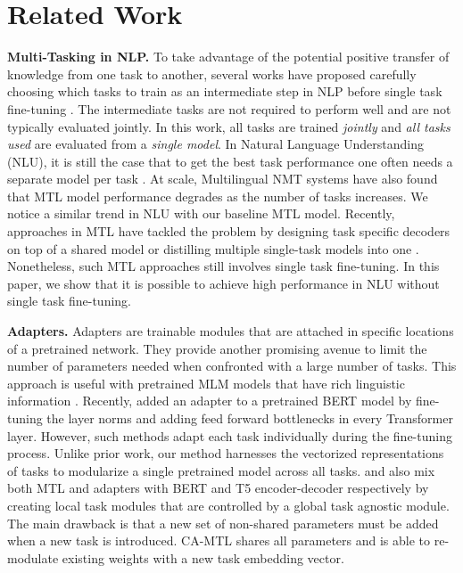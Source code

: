 \documentclass{article} \usepackage{iclr2021_conference,times}
\begin{document}
\vspace{-10pt}
\section{Related Work}
\vspace{-5pt}

\textbf{Multi-Tasking in NLP.}
To take advantage of the potential positive transfer of knowledge from one task to another, several works have proposed carefully choosing which tasks to train as an intermediate step in NLP before single task fine-tuning \citep{bingel-sogaard-2017-identifying,kerinec-etal-2018-deep,wang-acl-19,DBLP:journals/corr/abs-1905-07553,pruksachatkun2020intermediate,DBLP:journals/corr/abs-1811-01088}. The intermediate tasks are not required to perform well and are not typically evaluated jointly. In this work, all tasks are trained \emph{jointly} and \emph{all tasks used} are evaluated from a \emph{single model}. In Natural Language Understanding (NLU), it is still the case that to get the best task performance one often needs a separate model per task \citep{mtl_bert_clark2019,mccann2018natural}.
At scale, Multilingual NMT systems \citep{aharoni-etal-2019-massively} have also found that MTL model performance degrades as the number of tasks increases. We notice a similar trend in NLU with our baseline MTL model.
Recently, approaches in MTL have tackled the problem by designing task specific decoders on top of a shared model \citep{mtl_bert_liu2019} or distilling multiple single-task models into one \citep{mtl_bert_clark2019}. Nonetheless, such MTL approaches still involves single task fine-tuning. In this paper, we show that it is possible to achieve high performance in NLU without single task fine-tuning. 



\textbf{Adapters.}
Adapters are  trainable modules that are attached in specific locations of a pretrained network. They provide another promising avenue to limit the number of parameters needed when confronted with a large number of tasks. This approach is useful with pretrained MLM models that have rich linguistic information  \citep{context_prob,bert_analysis,trans_context,bert_classicnlp}.  Recently, \citet{DBLP:journals/corr/abs-1902-00751} added an adapter to a pretrained BERT model by fine-tuning the layer norms and adding feed forward bottlenecks in every Transformer layer. 
However, such methods adapt each task individually during the fine-tuning process. Unlike prior work, our method harnesses the vectorized representations of tasks to modularize a single pretrained model across all tasks. \citet{pmlr-v97-stickland19a} and \citet{tay2020hypergrid} also mix both MTL and adapters with BERT and T5 encoder-decoder \citep{t5} respectively by creating local task modules that are controlled by a global task agnostic module. The main drawback is that a new set of non-shared parameters must be added when a new task is introduced. CA-MTL shares all parameters and is able to re-modulate existing weights with a new task embedding vector.
\end{document}
